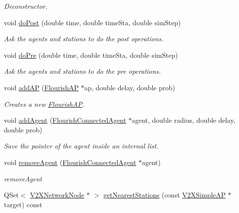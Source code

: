 \begin{DoxyCompactItemize}
\begin{DoxyCompactList}\small\item\em Deconstructor. \end{DoxyCompactList}\item 
void \hyperlink{classFlourishBroker_a56893aa4d35d71c353d8fd1f9dc03fee}{do\+Post} (double time, double time\+Sta, double sim\+Step)
\begin{DoxyCompactList}\small\item\em Ask the agents and stations to do the post operations. \end{DoxyCompactList}\item 
void \hyperlink{classFlourishBroker_a8003c8ada9ce635b6cde81584b5f7265}{do\+Pre} (double time, double time\+Sta, double sim\+Step)
\begin{DoxyCompactList}\small\item\em Ask the agents and stations to do the pre operations. \end{DoxyCompactList}\item 
void \hyperlink{classFlourishBroker_a2ac65b27e43f3fcb89a384edac8d300b}{add\+AP} (\hyperlink{classFlourishAP}{Flourish\+AP} $\ast$ap, double delay, double prob)
\begin{DoxyCompactList}\small\item\em Creates a new \hyperlink{classFlourishAP}{Flourish\+AP}. \end{DoxyCompactList}\item 
void \hyperlink{classFlourishBroker_ad861cc52e98e29f4880c4db07ba25166}{add\+Agent} (\hyperlink{classFlourishConnectedAgent}{Flourish\+Connected\+Agent} $\ast$agent, double radius, double delay, double prob)
\begin{DoxyCompactList}\small\item\em Save the pointer of the agent inside an internal list. \end{DoxyCompactList}\item 
void \hyperlink{classFlourishBroker_ade755d5bccedaebc2412a2f211600ec1}{remove\+Agent} (\hyperlink{classFlourishConnectedAgent}{Flourish\+Connected\+Agent} $\ast$agent)
\begin{DoxyCompactList}\small\item\em remove\+Agent \end{DoxyCompactList}\item 
Q\+Set$<$ \hyperlink{classV2XNetworkNode}{V2\+X\+Network\+Node} $\ast$ $>$ \hyperlink{classFlourishBroker_ae8685fc139bea35d3f74ecb2bf998004}{get\+Nearest\+Stations} (const \hyperlink{classV2XSimpleAP}{V2\+X\+Simple\+AP} $\ast$target) const 

\end{DoxyCompactItemize}

